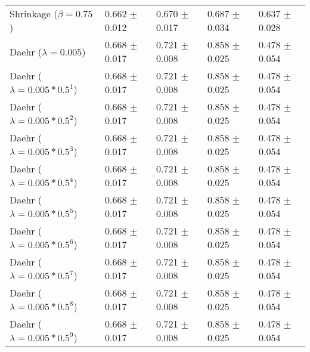 \begin{table}
\begin{tabular}{*{5}{l}}
Shrinkage ($\beta=0.75$)&0.662 $\pm$ 0.012&0.670 $\pm$ 0.017&0.687 $\pm$ 0.034&0.637 $\pm$ 0.028\\
Daehr ($\lambda=0.005$)&0.668 $\pm$ 0.017&0.721 $\pm$ 0.008&0.858 $\pm$ 0.025&0.478 $\pm$ 0.054\\
Daehr ($\lambda=0.005*0.5^1$)&0.668 $\pm$ 0.017&0.721 $\pm$ 0.008&0.858 $\pm$ 0.025&0.478 $\pm$ 0.054\\
Daehr ($\lambda=0.005*0.5^2$)&0.668 $\pm$ 0.017&0.721 $\pm$ 0.008&0.858 $\pm$ 0.025&0.478 $\pm$ 0.054\\
Daehr ($\lambda=0.005*0.5^3$)&0.668 $\pm$ 0.017&0.721 $\pm$ 0.008&0.858 $\pm$ 0.025&0.478 $\pm$ 0.054\\
Daehr ($\lambda=0.005*0.5^4$)&0.668 $\pm$ 0.017&0.721 $\pm$ 0.008&0.858 $\pm$ 0.025&0.478 $\pm$ 0.054\\
Daehr ($\lambda=0.005*0.5^5$)&0.668 $\pm$ 0.017&0.721 $\pm$ 0.008&0.858 $\pm$ 0.025&0.478 $\pm$ 0.054\\
Daehr ($\lambda=0.005*0.5^6$)&0.668 $\pm$ 0.017&0.721 $\pm$ 0.008&0.858 $\pm$ 0.025&0.478 $\pm$ 0.054\\
Daehr ($\lambda=0.005*0.5^7$)&0.668 $\pm$ 0.017&0.721 $\pm$ 0.008&0.858 $\pm$ 0.025&0.478 $\pm$ 0.054\\
Daehr ($\lambda=0.005*0.5^8$)&0.668 $\pm$ 0.017&0.721 $\pm$ 0.008&0.858 $\pm$ 0.025&0.478 $\pm$ 0.054\\
Daehr ($\lambda=0.005*0.5^9$)&0.668 $\pm$ 0.017&0.721 $\pm$ 0.008&0.858 $\pm$ 0.025&0.478 $\pm$ 0.054\\
\bottomrule
\end{tabular}
\end{table}

